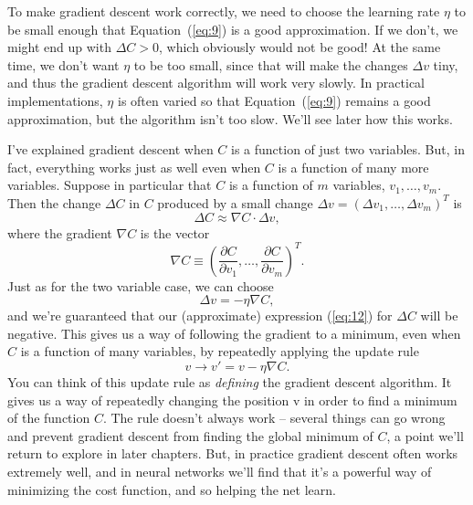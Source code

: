\documentclass[a4paper,twoside,10pt]{book}
\begin{document}
To make gradient descent work correctly, we need to choose the learning rate $\eta$ to be small enough that Equation~(\ref{eq:9}) is a good approximation. If we don't, we might end up with $\Delta C > 0$, which obviously would not be good! At the same time, we don't want $\eta$ to be too small, since that will make the changes $\Delta v$ tiny, and thus the gradient descent algorithm will work very slowly. In practical implementations, $\eta$ is often varied so that Equation~(\ref{eq:9}) remains a good approximation, but the algorithm isn't too slow. We'll see later how this works.

I've explained gradient descent when $C$ is a function of just two variables. But, in fact, everything works just as well even when $C$ is a function of many more variables. Suppose in particular that $C$ is a function of $m$ variables, $v_1, \ldots,v_m$. Then the change $\Delta C$ in $C$ produced by a small change $\Delta v = (\Delta v_1, \ldots, \Delta v_m)^T$ is
\begin{equation}
	\Delta C \approx \nabla C \cdot \Delta v,
	\tag{12}\label{eq:12}
\end{equation}
where the gradient $\nabla C$ is the vector
\begin{equation}
\nabla C \equiv \left(\frac{\partial C}{\partial v_1}, \ldots, \frac{\partial C}{\partial v_m}\right)^T.
\tag{13}\label{eq:13}
\end{equation}
Just as for the two variable case, we can choose
\begin{equation}
\Delta v = -\eta \nabla C, \tag{14}\label{eq:14}
\end{equation}
and we're guaranteed that our (approximate) expression (\ref{eq:12}) for $\Delta C$ will be negative. This gives us a way of following the gradient to a minimum, even when $C$ is a function of many variables, by repeatedly applying the update rule
\begin{equation}
v \rightarrow v' = v-\eta \nabla C.
\tag{15}\label{eq:15}
\end{equation}
You can think of this update rule as \textit{defining} the gradient descent algorithm. It gives us a way of repeatedly changing the position v in order to find a minimum of the function $C$. The rule doesn't always work -- several things can go wrong and prevent gradient descent from finding the global minimum of $C$, a point we'll return to explore in later chapters. But, in practice gradient descent often works extremely well, and in neural networks we'll find that it's a powerful way of minimizing the cost function, and so helping the net learn.
\end{document}
